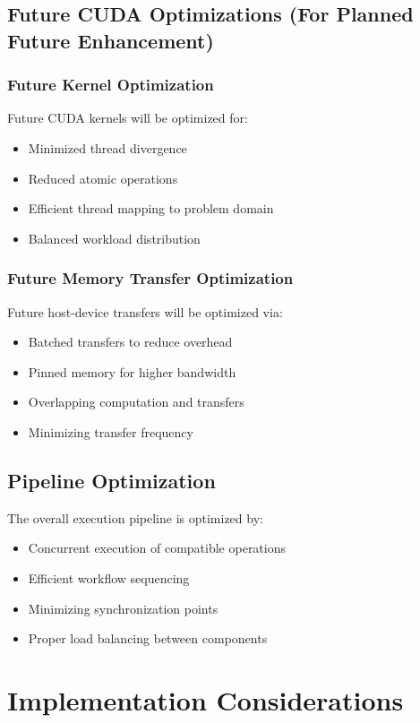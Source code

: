 \documentclass[conference]{IEEEtran}
\begin{document}
\subsection{Future CUDA Optimizations (For Planned Future Enhancement)}

\subsubsection{Future Kernel Optimization}
Future CUDA kernels will be optimized for:
\begin{itemize}
    \item Minimized thread divergence
    \item Reduced atomic operations
    \item Efficient thread mapping to problem domain
    \item Balanced workload distribution
\end{itemize}

\subsubsection{Future Memory Transfer Optimization}
Future host-device transfers will be optimized via:
\begin{itemize}
    \item Batched transfers to reduce overhead
    \item Pinned memory for higher bandwidth
    \item Overlapping computation and transfers
    \item Minimizing transfer frequency
\end{itemize}

\subsection{Pipeline Optimization}
The overall execution pipeline is optimized by:
\begin{itemize}
    \item Concurrent execution of compatible operations
    \item Efficient workflow sequencing
    \item Minimizing synchronization points
    \item Proper load balancing between components
\end{itemize}

\section{Implementation Considerations}
\end{document}
